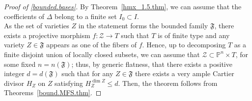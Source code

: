 \documentclass{amsart}[12pt,a4paper]
\theoremstyle{definition}
\begin{document}
\begin{proof}[Proof of \ref{bounded.bases}]
By Theorem~\ref{hmx_1.5.thm}, we can assume that the coefficients of $\Delta$ belong to a finite set $I_0 \subset I$.
\\
As the set of varieties $Z$ in the statement forms the bounded family $\mathfrak{F}$, 
there exists a projective morphism $f \colon \mathcal Z \to T$ such that $T$ is of finite type and any variety $Z \in \mathfrak F$ appears as one of the fibers of $f$.
Hence, up to decomposing $T$ as a finite disjoint union of locally closed subsets, we can assume that $\mathcal Z \subset \mathbb{P}^n \times T$, for some fixed $n=n(\mathfrak F)$; 
thus, by generic flatness, that there exists a positive integer $d=d(\mathfrak{F})$ such that for any $Z \in \mathfrak F$ there exists a very ample Cartier divisor $H_Z$ on $Z$ satisfying $H_Z^{\dim Z} \leq d$.
\newline
Then, the theorem follows from Theorems~\ref{bound.MFS.thm}.
\end{proof}
\end{document}
